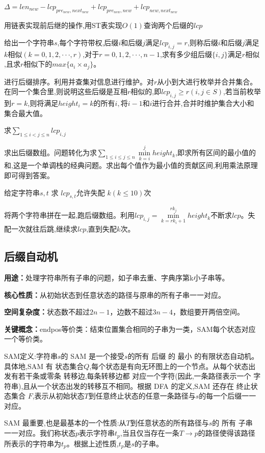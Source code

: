 \documentclass[a4paper,fontset=none]{ctexart}
\begin{document}
$\Delta=len_{new}-lcp_{pre_{new},next_{new}}+lcp_{pre_{new},new}+lcp_{new,next_{new}}$ 

用链表实现前后继的操作,用ST表实现$O(1)$查询两个后缀的$lcp$

给出一个字符串$s$,每个字符带权,后缀$i$和后缀$j$满足$lcp_{i,j}=r$,则称后缀$i$和后缀$j$满足$k相似(k=0,1,2,···,r)$,对于$r=0,1,2,···,n-1$,求有多少组后缀$\{i,j\}$满足$r相似$,且求$r相似下的$$max\{a_i\times a_j\}$。

进行后缀排序。利用并查集对信息进行维护。对$r$从小到大进行枚举并合并集合。在同一个集合里,则说明这些后缀是互相$r相似的$,即$lcp_{i,j}\ge r(i,j\in S)$,若当前枚举到$r=k$,则将满足$height_i=k的所有i,将i-1和i进行合并$,合并时维护集合大小和集合最大值。

求$\sum\limits_{1\leqslant i<j\leqslant n}lcp_{i,j}$

求出后缀数组。问题转化为求$\sum\limits_{1\leqslant i\leqslant j\leqslant n}\min\limits_{k=i}^jheight_{k}$,即求所有区间的最小值的和,这是一个单调栈的经典问题。求出每个值作为最小值的贡献区间,利用乘法原理即可得到答案。

给定字符串$s,t$ 求 $lcp_{s,t}$允许失配 $k(k\leqslant 10)$次

将两个字符串拼在一起,跑后缀数组。利用$lcp_{i,j}=\min\limits_{k=rk_i+1}^{rk_j}height_k$不断求$lcp$。失配一次就往后跳,继续求$lcp$,直到失配$k$次。
\subsection{后缀自动机}
\textbf{用途：}处理字符串所有子串的问题，如子串去重、字典序第k小子串等。

\textbf{核心性质：}从初始状态到任意状态的路径与原串的所有子串一一对应。

\textbf{空间复杂度：}状态数不超过$2n-1$，边数不超过$3n-4$，数组要开两倍空间。

\textbf{关键概念：}endpos等价类：结束位置集合相同的子串为一类，SAM每个状态对应一个等价类。

SAM定义:字符串$s$的 SAM 是一个接受$s$的所有 后缀 的 最小 的有限状态自动机。具体地,SAM 有 状态集合$Q$,每个状态是有向无环图上的一个节点。从每个状态出发有若干条或零条 转移边,每条转移边都 对应一个字符(因此,一条路径表示一个 字符串),且从一个状态出发的转移互不相同。根据 DFA 的定义,SAM 还存在 终止状态集合 $F$,表示从初始状态$T$到任意终止状态的任意一条路径与$s$的每一个后缀一一对应。

SAM 最重要,也是最基本的一个性质:从$T$到任意状态的所有路径与$s$的 所有 子串 一一对应。我们称状态$p$表示字符串$t_p$,当且仅当存在一条$T\rightarrow p$的路径使得该路径所表示的字符串为$t_p$。根据上述性质,$t_p$是$s$的子串。
\end{document}

